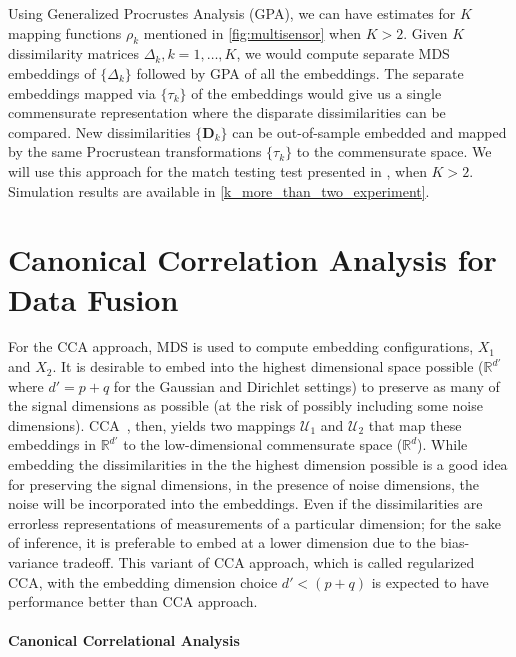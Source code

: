 \documentclass[12pt,oneside,final]{thesis}\usepackage[]{graphicx}\usepackage[]{color}
\begin{document}
Using Generalized Procrustes Analysis (GPA), we can have estimates for $K$ mapping functions $\rho_k$ mentioned in \ref{fig:multisensor} when $K>2$. Given $K$  dissimilarity matrices $\Delta_k,k=1,\ldots,K$,  we would compute separate  MDS embeddings of  $\{\Delta_k \}$  followed by GPA of all the embeddings. The separate embeddings mapped via $\{\tau_k \}$ of the embeddings would give us a single commensurate representation where the disparate dissimilarities can be compared. New dissimilarities $\{ \bm{D}_k \}$ can be out-of-sample embedded  and mapped by the same Procrustean transformations  $\{\tau_k \}$ to the commensurate space. We will use this approach  for the match testing test presented in \label{sec:match detection}, when $K>2$. Simulation results are available in \ref{k_more_than_two_experiment}.






\chapter{Canonical Correlation Analysis for Data Fusion}
\label{sec:CCA}

For the CCA approach, MDS is used  to compute embedding configurations, $ X_1$ and $X_2$. It is desirable to  embed into the highest dimensional space  possible ($\mathbb{R}^{d'}$ where $d'=p+q$ for the Gaussian and Dirichlet settings)  to  preserve as many of the signal dimensions as possible (at the risk of possibly including  some noise dimensions). CCA~\cite{Hardoon2004}, then,  yields two mappings $\mathcal{U}_1$ and $\mathcal{U}_2$ that map these embeddings in $\mathbb{R}^{d'}$ to  the low-dimensional commensurate space ($\mathbb{R}^d$). 
While embedding the dissimilarities in the the highest dimension possible is a good idea for preserving the signal dimensions, in the presence of noise dimensions, the noise will be incorporated into the embeddings. Even if the dissimilarities are errorless representations of measurements of a particular dimension; for  the  sake of inference, it is preferable to embed at a lower  dimension due to the bias-variance tradeoff. This variant of CCA approach, which is called regularized CCA, with the  embedding dimension choice $d'< (p+q)$ is expected to have performance better than CCA approach.

\subsubsection*{Canonical Correlational Analysis}
\end{document}

